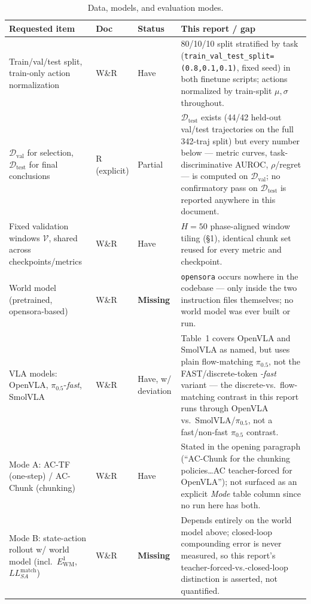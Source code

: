 \documentclass[11pt]{article}
\begin{document}
\begin{table}[h]
\centering
\footnotesize
\caption{Data, models, and evaluation modes.}
\begin{tabular}{p{3.1cm}p{1.0cm}p{1.6cm}p{8.0cm}}
\toprule
Requested item & Doc & Status & This report / gap \\
\midrule
Train/val/test split, train-only action normalization & W\&R & Have &
80/10/10 split stratified by task (\texttt{train\_val\_test\_split=(0.8,0.1,0.1)}, fixed seed) in
both finetune scripts; actions normalized by train-split $\mu,\sigma$ throughout. \\
$\mathcal D_{\mathrm{val}}$ for selection, $\mathcal D_{\mathrm{test}}$ for final conclusions & R
(explicit) & Partial &
$\mathcal D_{\mathrm{test}}$ exists (44/42 held-out val/test trajectories on the full 342-traj
split) but every number below --- metric curves, task-discriminative AUROC, $\rho$/regret --- is
computed on $\mathcal D_{\mathrm{val}}$; no confirmatory pass on $\mathcal D_{\mathrm{test}}$ is
reported anywhere in this document. \\
Fixed validation windows $\mathcal V$, shared across checkpoints/metrics & W\&R & Have &
$H{=}50$ phase-aligned window tiling (\S1), identical chunk set reused for every metric and
checkpoint. \\
World model (pretrained, opensora-based) & W\&R & \textbf{Missing} &
\texttt{opensora} occurs nowhere in the codebase --- only inside the two instruction files
themselves; no world model was ever built or run. \\
VLA models: OpenVLA, $\pi_{0.5}$-\emph{fast}, SmolVLA & W\&R & Have, w/ deviation &
Table~1 covers OpenVLA and SmolVLA as named, but uses plain flow-matching $\pi_{0.5}$, not the
FAST/discrete-token \emph{-fast} variant --- the discrete-vs.\ flow-matching contrast in this report
runs through OpenVLA vs.\ SmolVLA/$\pi_{0.5}$, not a fast/non-fast $\pi_{0.5}$ contrast. \\
Mode A: AC-TF (one-step) / AC-Chunk (chunking) & W\&R & Have &
Stated in the opening paragraph (``AC-Chunk for the chunking policies\ldots AC teacher-forced for
OpenVLA''); not surfaced as an explicit \emph{Mode} table column since no run here has both. \\
Mode B: state-action rollout w/ world model (incl.\ $E_{\mathrm{WM}}^1$, $LL^{\mathrm{match}}_{SA}$)
& W\&R & \textbf{Missing} &
Depends entirely on the world model above; closed-loop compounding error is never measured, so this
report's teacher-forced-vs.-closed-loop distinction is asserted, not quantified. \\
\bottomrule
\end{tabular}
\end{table}
\end{document}
